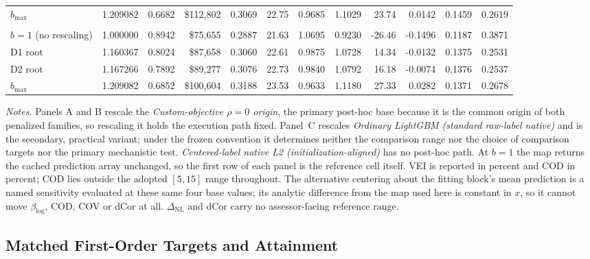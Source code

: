 \documentclass[10pt]{article}
\theoremstyle{definition}
\newcommand{\1}{\mathbf{1}}
\begin{document}
{\begin{table}[!htbp]
{\begin{tabular}{@{}lrrrrrrrrrrr@{}}
$b_{\max}$ & 1.209082 & 0.6682 & \$112,802 & 0.3069 & 22.75 & 0.9685 & 1.1029 & 23.74 & 0.0142 & 0.1459 & 0.2619 \\
\addlinespace[2pt]
\multicolumn{12}{l}{\textit{Panel C: \emph{Ordinary LightGBM (standard raw-label native)} rescaled, held-out (secondary, practical)}} \\
\addlinespace[2pt]
\cmidrule(lr){1-12}
$b=1$ (no rescaling) & 1.000000 & 0.8942 & \$75,655 & 0.2887 & 21.63 & 1.0695 & 0.9230 & -26.46 & -0.1496 & 0.1187 & 0.3871 \\
D1 root & 1.160367 & 0.8024 & \$87,658 & 0.3060 & 22.61 & 0.9875 & 1.0728 & 14.34 & -0.0132 & 0.1375 & 0.2531 \\
D2 root & 1.167266 & 0.7892 & \$89,277 & 0.3076 & 22.73 & 0.9840 & 1.0792 & 16.18 & -0.0074 & 0.1376 & 0.2537 \\
$b_{\max}$ & 1.209082 & 0.6852 & \$100,604 & 0.3188 & 23.53 & 0.9633 & 1.1180 & 27.33 & 0.0282 & 0.1371 & 0.2678 \\
\bottomrule
\end{tabular}}
\vspace{1mm}
\begin{minipage}{\textwidth}
\scriptsize
\emph{Notes.}
Panels A and B rescale the \emph{Custom-objective $\rho=0$ origin}, the primary post-hoc
base because it is the common origin of both penalized families, so rescaling it holds the execution
path fixed. Panel~C rescales \emph{Ordinary LightGBM (standard raw-label native)} and is the
secondary, practical variant; under the frozen convention it determines neither the comparison range
nor the choice of comparison targets nor the primary mechanistic test. \emph{Centered-label native
L2 (initialization-aligned)} has no post-hoc path. At $b=1$ the map returns the cached prediction
array unchanged, so the first row of each panel is the reference cell itself. VEI is reported in
percent and COD in percent; COD lies outside the adopted $[5,15]$ range throughout. The alternative
centering about the fitting block's mean prediction is a named sensitivity evaluated at these same
four base values; its analytic difference from the map used here is constant in $x$, so it cannot
move $\beta_{\log}$, COD, COV or dCor at all. $\Delta_{\mathrm{NL}}$ and dCor carry no
assessor-facing reference range.
\end{minipage}
\end{table}
}


\subsection{Matched First-Order Targets and Attainment}
\label{app:matched_beta_detail}
\end{document}
